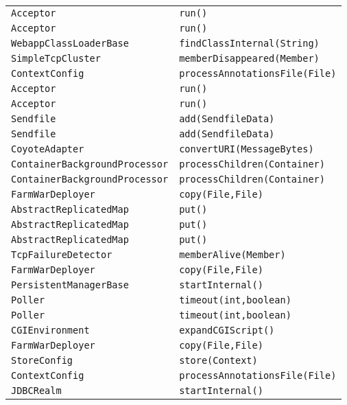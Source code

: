 \begin{center}
\begin{longtable}{ll}
\lstinline/Acceptor/&{\lstinline/run()/}\\
\lstinline/Acceptor/&{\lstinline/run()/}\\
\lstinline/WebappClassLoaderBase/&{\lstinline/findClassInternal(String)/}\\
\lstinline/SimpleTcpCluster/&{\lstinline/memberDisappeared(Member)/}\\
\lstinline/ContextConfig/&{\lstinline/processAnnotationsFile(File)/}\\
\lstinline/Acceptor/&{\lstinline/run()/}\\
\lstinline/Acceptor/&{\lstinline/run()/}\\
\lstinline/Sendfile/&{\lstinline/add(SendfileData)/}\\
\lstinline/Sendfile/&{\lstinline/add(SendfileData)/}\\
\lstinline/CoyoteAdapter/&{\lstinline/convertURI(MessageBytes)/}\\
\lstinline/ContainerBackgroundProcessor/&{\lstinline/processChildren(Container)/}\\
\lstinline/ContainerBackgroundProcessor/&{\lstinline/processChildren(Container)/}\\
\lstinline/FarmWarDeployer/&{\lstinline/copy(File,File)/}\\
\lstinline/AbstractReplicatedMap/&{\lstinline/put()/}\\
\lstinline/AbstractReplicatedMap/&{\lstinline/put()/}\\
\lstinline/AbstractReplicatedMap/&{\lstinline/put()/}\\
\lstinline/TcpFailureDetector/&{\lstinline/memberAlive(Member)/}\\
\lstinline/FarmWarDeployer/&{\lstinline/copy(File,File)/}\\
\lstinline/PersistentManagerBase/&{\lstinline/startInternal()/}\\
\lstinline/Poller/&{\lstinline/timeout(int,boolean)/}\\
\lstinline/Poller/&{\lstinline/timeout(int,boolean)/}\\
\lstinline/CGIEnvironment/&{\lstinline/expandCGIScript()/}\\
\lstinline/FarmWarDeployer/&{\lstinline/copy(File,File)/}\\
\lstinline/StoreConfig/&{\lstinline/store(Context)/}\\
\lstinline/ContextConfig/&{\lstinline/processAnnotationsFile(File)/}\\
\lstinline/JDBCRealm/&{\lstinline/startInternal()/}\\

\end{longtable}
\end{center}
